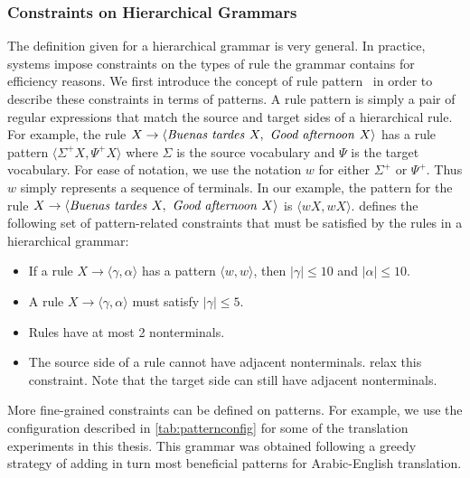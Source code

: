 \subsubsection{Constraints on Hierarchical Grammars}
\label{sec:constraintsOnHierarhicalGrammars}

The definition given for a hierarchical grammar is very general.
In practice, systems impose constraints on the types of rule the grammar contains
for efficiency reasons.
We first introduce the concept of rule
pattern~\citep{iglesias-degispert-banga-byrne:2009:EACL} in order
to describe these constraints in terms of patterns.
A rule pattern is simply a pair of regular expressions that match
the source and target sides of a hierarchical rule.
For example, the rule $X \rightarrow \langle \text{\emph{Buenas tardes }} X, \text{\emph{ Good afternoon }} X \rangle$
has a rule pattern $\langle \Sigma^+ X, \Psi^+ X \rangle$ where $\Sigma$ is the
source vocabulary and $\Psi$ is the target vocabulary.
For ease of notation, we use the notation $w$ for either $\Sigma^+$
or $\Psi^+$. Thus $w$ simply represents a sequence of terminals.
In our example, the pattern for the rule $ X \rightarrow \langle \text{\emph{Buenas tardes }} X, \text{\emph{ Good afternoon }} X \rangle$ is $\langle w X, w X \rangle$.
\citet{chiang:2007:CL} defines the following set of pattern-related constraints
that must be satisfied by the rules in a hierarchical grammar:
%
\begin{itemize}
  \item If a rule $X \rightarrow \langle \gamma, \alpha \rangle$ has a pattern $\langle w, w \rangle$, then $|\gamma| \leq 10$ and $|\alpha| \leq 10$.
  \item A rule $X \rightarrow \langle \gamma, \alpha \rangle$ must satisfy $|\gamma| \leq 5$.
  \item Rules have at most 2 nonterminals.
  \item The source side of a rule cannot have adjacent nonterminals.
    \citet{setiawan-resnik:2010:NAACL} relax this constraint.
    Note that the target side can still
    have adjacent nonterminals. %
  \end{itemize}
%
More fine-grained constraints can be defined on patterns.
For example, we use the configuration described
in \autoref{tab:patternconfig} for some of the translation experiments in this
thesis. This grammar was obtained following a greedy strategy of adding
in turn most beneficial patterns for Arabic-English translation.

